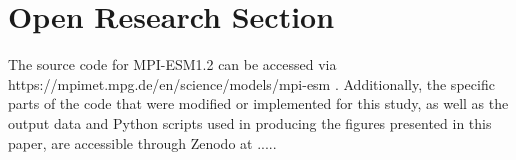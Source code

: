 \documentclass[draft]{agujournal2019}
\begin{document}
%








%
%

\section*{Open Research Section}
The source code for MPI-ESM1.2 can be accessed via https://mpimet.mpg.de/en/science/models/mpi-esm \cite{Mauritsen_2019}. Additionally, the specific parts of the code that were modified or implemented for this study, as well as the output data and Python scripts used in producing the figures presented in this paper, are accessible through Zenodo at ..... \cite{}


\end{document}
